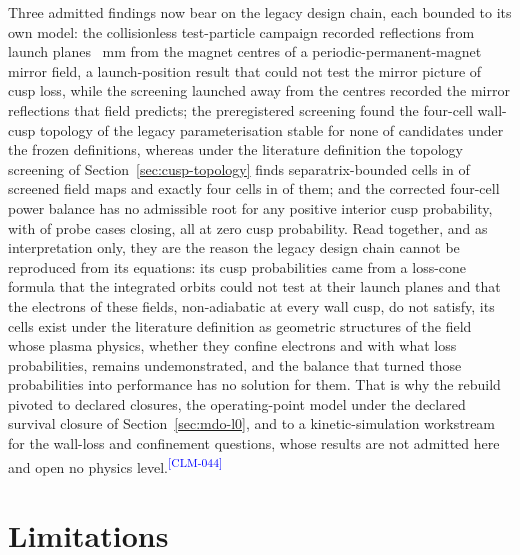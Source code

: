 \documentclass[11pt]{article}
\newcommand{\EvidenceClaim}[2]{#2\textsuperscript{\textcolor{blue}{[#1]}}}
\begin{document}
\EvidenceClaim{CLM-044}{Three admitted findings now bear on the legacy design
chain, each bounded to its own model: the collisionless test-particle campaign
recorded \WlfPooledReflected{} reflections from launch planes
\SwtVFourLaunchOffsetMm{}~mm from the magnet centres of a
periodic-permanent-magnet mirror field, a launch-position result that could not
test the mirror picture of cusp loss, while the screening launched away from the
centres recorded the mirror reflections that field predicts; the preregistered screening found the
four-cell wall-cusp topology of the legacy parameterisation stable for none of
\FcnEvaluated{} candidates under the frozen definitions, whereas under the
literature definition the topology screening of Section~\ref{sec:cusp-topology}
finds separatrix-bounded cells in \CtvWithCuspAll{} of \CtvDesignCount{}
screened field maps and exactly four cells in \CtvFourCellsAll{} of them; and
the corrected four-cell power balance has no admissible root for any positive
interior cusp probability, with \FccProbeClosed{} of \FccProbeTotal{} probe
cases closing, all at zero cusp probability. Read together, and as
interpretation only, they are the reason the legacy design chain cannot be
reproduced from its equations: its cusp probabilities came from a loss-cone
formula that the integrated orbits could not test at their launch planes and
that the electrons of these fields, non-adiabatic at every wall cusp, do not
satisfy, its cells exist under the literature
definition as geometric structures of the field whose plasma physics, whether
they confine electrons and with what loss probabilities, remains undemonstrated,
and the balance that turned those probabilities into performance has no solution
for them. That is why the rebuild pivoted to declared closures, the
operating-point model under the declared survival closure of
Section~\ref{sec:mdo-l0}, and to a kinetic-simulation workstream for the
wall-loss and confinement questions, whose results are not admitted here and
open no physics level.}

\section{Limitations}
\end{document}
